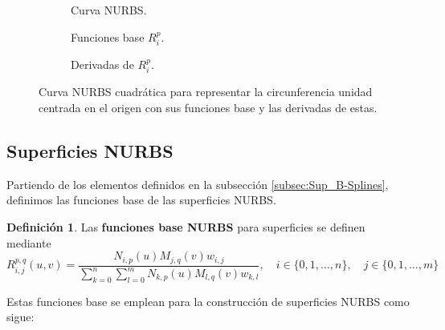 \documentclass[11pt]{book}
\theoremstyle{plain} %
\theoremstyle{definition} %
\newtheorem*{defin}{Definición} %
\theoremstyle{definition} %
\begin{document}
\vspace{-0.2cm}

\begin{figure}[H]
    \centering
    \begin{subfigure}{0.32\textwidth}
        
        \caption{Curva NURBS.}
        \label{fig:NURBS_curva_1}   
    \end{subfigure}
    \hfill
    \begin{subfigure}{0.33\textwidth}
        
        \caption{Funciones base $R_i^p$.}
        \label{fig:NURBS_curva_2}   
    \end{subfigure}
    \hfill
    \begin{subfigure}{0.32\textwidth}
        
        \caption{Derivadas de  $R_i^p$.}
        \label{fig:NURBS_curva_3}   
    \end{subfigure}

    \vspace{-0.15cm}


    \caption{Curva NURBS cuadrática para representar la circunferencia unidad centrada en el origen con sus funciones base y las derivadas de estas.}
    \label{fig:NURBS_curva}    
\end{figure}

\vspace{-1cm}

\subsection{Superficies NURBS}

Partiendo de los elementos definidos en la subsección \ref{subsec:Sup_B-Splines}, definimos
las funciones base de las superficies NURBS.

\begin{defin}
    Las \textbf{funciones base NURBS} para superficies se definen mediante
    \begin{equation} 
        \label{eq:NURBS_Surf_Basis}
        R_{i,j}^{p,q}(u, v) = \frac{N_{i,p}(u) M_{j,q}(v) w_{i,j}}{\sum_{k=0}^{n} \sum_{l=0}^{m} N_{k,p}(u) M_{l,q}(v) w_{k,l}} ,\quad i \in \{0,1, \dots , n\},\quad j \in \{0,1, \dots , m\}
    \end{equation}
\end{defin}

Estas funciones base se emplean para la construcción de superficies NURBS como sigue:
\end{document}
